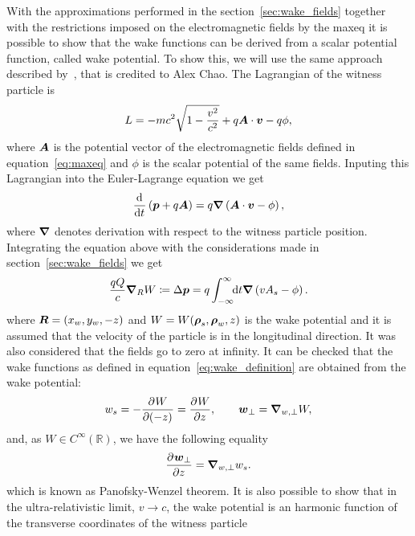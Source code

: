     With the approximations performed in the section~\ref{sec:wake_fields} together with the restrictions imposed on the electromagnetic fields by the \gls{maxeq} it is possible to show that the wake functions can be derived from a scalar potential function, called wake potential. To show this, we will use the same approach described by~, that is credited to Alex Chao. The Lagrangian of the witness particle is
    \begin{align}
  	  	L = -mc^2\sqrt{1 - \frac{v^2}{c^2}} + q\boldsymbol{A}\cdot\boldsymbol{v} - q\phi,
    \end{align}
    where $\boldsymbol{A}$ is the potential vector of the electromagnetic fields defined in equation~\eqref{eq:maxeq} and $\phi$ is the scalar potential of the same fields. Inputing this Lagrangian into the Euler-Lagrange equation we get
    \begin{align}
	  	\frac{\mathrm{d}^{{}}}{\mathrm{d} t^{{}}} \left(\boldsymbol{p} + q\boldsymbol{A}\right) = q\boldsymbol{\nabla}\left( \boldsymbol{A}\cdot\boldsymbol{v} - \phi\right),
    \end{align}
    where $\boldsymbol{\nabla}$ denotes derivation with respect to the witness particle position. Integrating the equation above with the considerations made in section~\ref{sec:wake_fields} we get
    \begin{align}
   		\frac{qQ}{c} \boldsymbol{\nabla}_R W \coloneqq \Delta\boldsymbol{p} = q\int_{-\infty}^{\infty}\!\!\text{d}t \boldsymbol{\nabla}\left(vA_s - \phi \right).
    \end{align}
    where $\boldsymbol{R} =(x_w, y_w, -z)$ and $W = W(\boldsymbol{\rho}_s, \boldsymbol{\rho}_w, z)$ is the wake potential and it is assumed that the velocity of the particle is in the longitudinal direction. It was also considered that the fields go to zero at infinity. It can be checked
    that the wake functions as defined in equation~\eqref{eq:wake_definition} are obtained from the wake potential:
    \begin{align}\label{eq:wake_from_potential}
   		w_s = - \frac{\partial^{{}}W}{\partial (-z)^{{}}} = \frac{\partial^{{}}W}{\partial z^{{}}},\qquad \boldsymbol{w}_\perp = \boldsymbol{\nabla}_{w,\perp} W,
    \end{align}
    and, as $W \in C^{\infty}(\mathbb{R})$, we have the following equality
    \begin{align}\label{eq:panofsky_wenzel_theorem}
   		\frac{\partial^{{}}\boldsymbol{w}_\perp}{\partial z^{{}}} = \boldsymbol{\nabla}_{w,\perp} w_s.
    \end{align}
    which is known as Panofsky-Wenzel theorem. It is also possible to show that in the ultra-relativistic limit, $v \to c$, the wake potential is an harmonic function of the transverse coordinates of the witness particle~\cite{Stupakov2000a}
